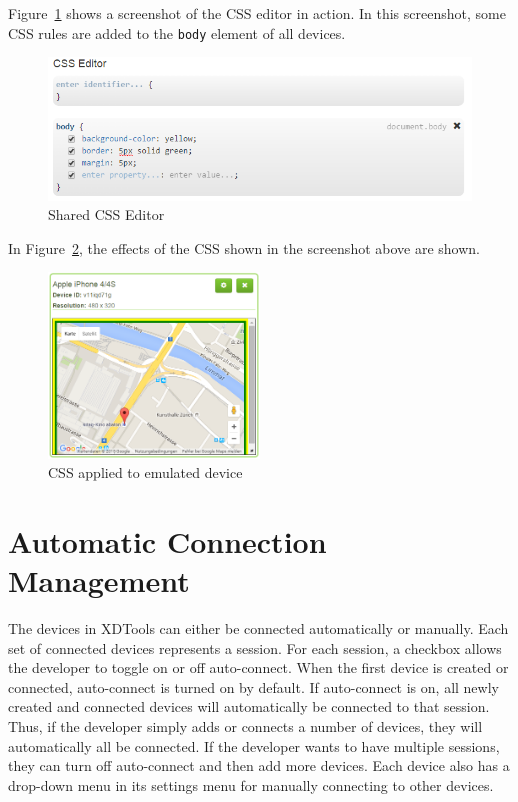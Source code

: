 Figure~\ref{fig:css_editor} shows a screenshot of the CSS editor in action. In this screenshot, some CSS rules are added to the \lstinline|body| element of all devices.

\begin{figure}[H]
  \centering
    \includegraphics[width=1.0\textwidth]{images/screenshots/css_editor.png}
	\caption[Screenshot: CSS editor]{Shared CSS Editor}
	\label{fig:css_editor}
\end{figure}

In Figure~\ref{fig:css_applied}, the effects of the CSS shown in the screenshot above are shown. 

\begin{figure}[H]
  \centering
    \includegraphics[width=0.5\textwidth]{images/screenshots/emulated_device_4.png}
	\caption[Screenshot: CSS effects]{CSS applied to emulated device}
	\label{fig:css_applied}
\end{figure}

\section{Automatic Connection Management}

The devices in XDTools can either be connected automatically or manually. Each set of connected devices represents a session. For each session, a checkbox allows the developer to toggle on or off auto-connect. When the first device is created or connected, auto-connect is turned on by default. If auto-connect is on, all newly created and connected devices will automatically be connected to that session. Thus, if the developer simply adds or connects a number of devices, they will automatically all be connected. If the developer wants to have multiple sessions, they can turn off auto-connect and then add more devices. Each device also has a drop-down menu in its settings menu for manually connecting to other devices. 

